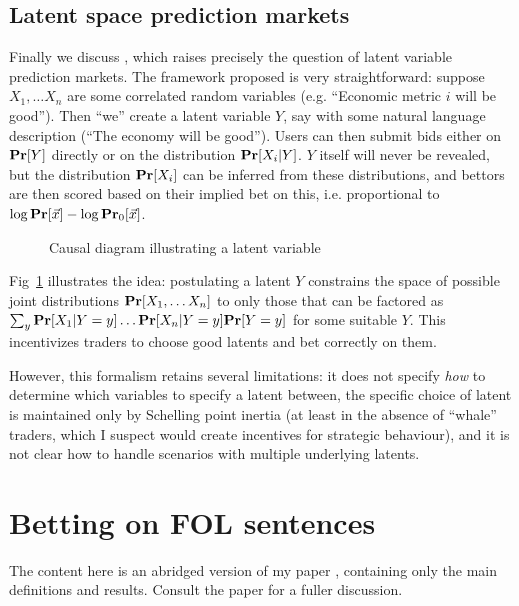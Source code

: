 \documentclass{article}
\begin{document}
\subsection{Latent space prediction markets}

Finally we discuss \cite{tailcalledLatentVariablesPrediction2023}, which raises precisely the question of latent variable prediction markets. The framework proposed is very straightforward: suppose $X_1,\dots X_n$ are some correlated random variables (e.g. ``Economic metric $i$ will be good''). Then ``we'' create a latent variable $Y$, say with some natural language description (``The economy will be good''). Users can then submit bids either on $\mathbf{Pr}[Y]$ directly or on the distribution $\mathbf{Pr}[X_i|Y]$. $Y$ itself will never be revealed, but the distribution $\mathbf{Pr}[X_i]$ can be inferred from these distributions, and bettors are then scored based on their implied bet on this, i.e. proportional to $\log \mathbf{Pr}[\vec{x}]-\log \mathbf{Pr}_0[\vec{x}]$.

\begin{figure}
    \centering
    
    \caption{Causal diagram illustrating a latent variable}
    \label{fig:latent}
\end{figure}

Fig~\ref{fig:latent} illustrates the idea: postulating a latent $Y$ constrains the space of possible joint distributions $\mathbf{Pr}[X_1,\dots X_n]$ to only those that can be factored as $\sum_y{\mathbf{Pr}[X_1|Y=y]\dots\mathbf{Pr}[X_n|Y=y]\mathbf{Pr}[Y=y]}$ for some suitable $Y$. This incentivizes traders to choose good latents and bet correctly on them.

However, this formalism retains several limitations: it does not specify \emph{how} to determine which variables to specify a latent between, the specific choice of latent is maintained only by Schelling point inertia (at least in the absence of ``whale'' traders, which I suspect would create incentives for strategic behaviour), and it is not clear how to handle scenarios with multiple underlying latents.

\section{Betting on FOL sentences}

The content here is an abridged version of my paper \cite{abhimanyupallavisudhirBettingWhatNeither2023}, containing only the main definitions and results. Consult the paper for a fuller discussion.
\end{document}
